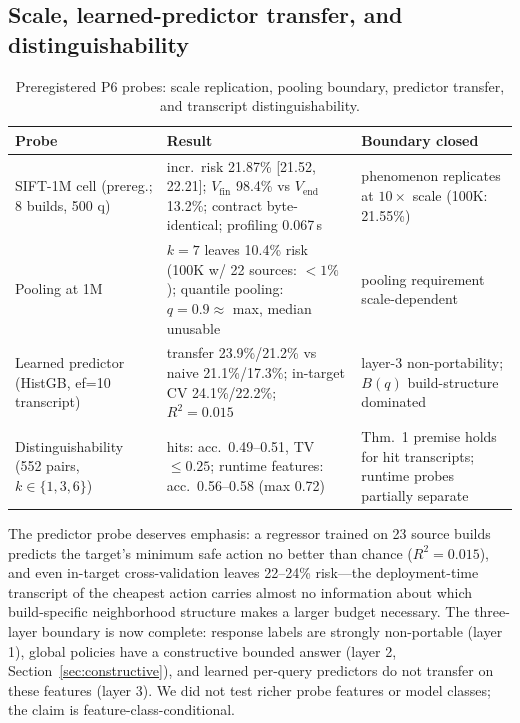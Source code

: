 \documentclass{article}
\begin{document}
\subsection{Scale, learned-predictor transfer, and distinguishability}
\label{sec:scale}

\begin{table}[t]
\centering
\caption{Preregistered P6 probes: scale replication, pooling boundary, predictor transfer, and transcript
distinguishability.}
\label{tab:p6}
\footnotesize
\setlength{\tabcolsep}{3pt}
\begin{tabular}{p{3.2cm}p{6.3cm}p{4.2cm}}
\toprule
Probe & Result & Boundary closed \\
\midrule
SIFT-1M cell (prereg.; 8 builds, 500 q) & incr.\ risk 21.87\% [21.52, 22.21]; $V_{\mathrm{fin}}$ 98.4\% vs $V_{\mathrm{end}}$ 13.2\%; contract byte-identical; profiling 0.067\,s & phenomenon replicates at $10\times$ scale (100K: 21.55\%) \\
Pooling at 1M & $k{=}7$ leaves 10.4\% risk (100K w/ 22 sources: $<1\%$); quantile pooling: $q{=}0.9 \approx$ max, median unusable & pooling requirement scale-dependent \\
Learned predictor (HistGB, ef{=}10 transcript) & transfer 23.9\%/21.2\% vs naive 21.1\%/17.3\%; in-target CV 24.1\%/22.2\%; $R^2=0.015$ & layer-3 non-portability; $B(q)$ build-structure dominated \\
Distinguishability (552 pairs, $k\in\{1,3,6\}$) & hits: acc.\ 0.49--0.51, TV $\le0.25$; runtime features: acc.\ 0.56--0.58 (max 0.72) & Thm.~1 premise holds for hit transcripts; runtime probes partially separate \\
\bottomrule
\end{tabular}
\end{table}

The predictor probe deserves emphasis: a regressor trained on 23 source builds predicts the target's
minimum safe action no better than chance ($R^2=0.015$), and even in-target cross-validation leaves
22--24\% risk---the deployment-time transcript of the cheapest action carries almost no information about
which build-specific neighborhood structure makes a larger budget necessary. The three-layer boundary is
now complete: response labels are strongly non-portable (layer 1), global policies have a constructive
bounded answer (layer 2, Section~\ref{sec:constructive}), and learned per-query predictors do not transfer
on these features (layer 3). We did not test richer probe features or model classes; the claim is
feature-class-conditional.
\end{document}
